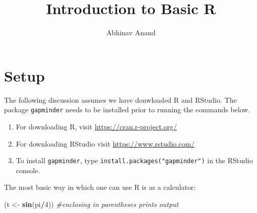\documentclass[11pt,]{article}
\title{Introduction to Basic R}
\author{Abhinav Anand}
\date{}
\newenvironment{Shaded}{\begin{snugshade}}{\end{snugshade}}
\newcommand{\KeywordTok}[1]{\textcolor[rgb]{0.13,0.29,0.53}{\textbf{#1}}}
\newcommand{\DataTypeTok}[1]{\textcolor[rgb]{0.13,0.29,0.53}{#1}}
\newcommand{\DecValTok}[1]{\textcolor[rgb]{0.00,0.00,0.81}{#1}}
\newcommand{\StringTok}[1]{\textcolor[rgb]{0.31,0.60,0.02}{#1}}
\newcommand{\CommentTok}[1]{\textcolor[rgb]{0.56,0.35,0.01}{\textit{#1}}}
\newcommand{\OperatorTok}[1]{\textcolor[rgb]{0.81,0.36,0.00}{\textbf{#1}}}
\newcommand{\NormalTok}[1]{#1}
\providecommand{\tightlist}{%
  \setlength{\itemsep}{0pt}\setlength{\parskip}{0pt}}
\begin{document}
\maketitle

\section{Setup}\label{setup}

The following discussion assumes we have donwloaded R and RStudio. The
package \texttt{gapminder} needs to be installed prior to running the
commands below.

\begin{enumerate}
\def\labelenumi{\arabic{enumi}.}
\tightlist
\item
  For downloading R, visit \url{https://cran.r-project.org/}
\item
  For downloading RStudio visit \url{https://www.rstudio.com/}
\item
  To install \texttt{gapminder}, type
  \texttt{install.packages("gapminder")} in the RStudio console.
\end{enumerate}

\begin{Shaded}
\end{Shaded}

The most basic way in which one can use R is as a calculator:

\begin{Shaded}
\begin{Highlighting}[]
\NormalTok{(t <-}\StringTok{ }\KeywordTok{sin}\NormalTok{(pi}\OperatorTok{/}\DecValTok{4}\NormalTok{)) }\CommentTok{#enclosing in parentheses prints output}
\end{Highlighting}
\end{Shaded}
\end{document}
